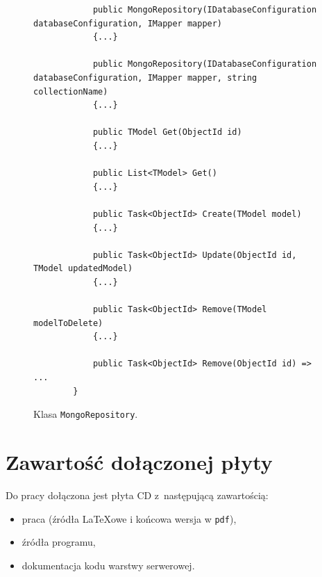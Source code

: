 \documentclass[a4paper,twoside,12pt]{book}
\begin{document}
\begin{appendices}
\begin{figure}
\begin{lstlisting}
			public MongoRepository(IDatabaseConfiguration databaseConfiguration, IMapper mapper)
			{...}

			public MongoRepository(IDatabaseConfiguration databaseConfiguration, IMapper mapper, string collectionName)
			{...}
			
			public TModel Get(ObjectId id)
			{...}
			
			public List<TModel> Get()
			{...}
			
			public Task<ObjectId> Create(TModel model)
			{...}
			
			public Task<ObjectId> Update(ObjectId id, TModel updatedModel)
			{...}
			
			public Task<ObjectId> Remove(TModel modelToDelete)
			{...}
			
			public Task<ObjectId> Remove(ObjectId id) => ...
		}
	\end{lstlisting}
	\caption{Klasa \lstinline|MongoRepository|.}
	\label{fig:mongoRepository}
\end{figure} 

\chapter*{Zawartość dołączonej płyty}

Do pracy dołączona jest płyta CD z~następującą zawartością:
\begin{itemize}
\item praca (źródła \LaTeX owe i końcowa wersja w \texttt{pdf}),
\item źródła programu,
\item dokumentacja kodu warstwy serwerowej.
\end{itemize}

\listoffigures
\listoftables
	
\end{appendices}
\end{document}
